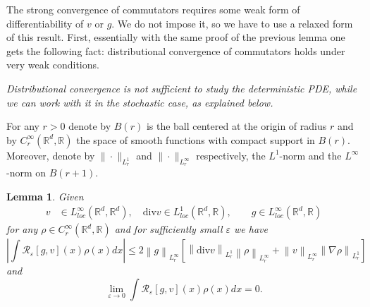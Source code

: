 \documentclass[a4paper,10pt]{article}
\newtheorem{lemma}[theorem]{Lemma}
\begin{document}
The strong convergence of commutators requires some weak form of
differentiability of $v$ or $g$. We do not impose it, so we have to use a
relaxed form of this result. First, essentially with the same proof of the
previous lemma one gets the following fact: distributional convergence of
commutators holds under very weak conditions.

{\it Distributional convergence is not sufficient to study the
 deterministic PDE, while we can work with it in the stochastic
case, as explained below.}


For any $r>0$ denote by $B\left(  r\right)  $ is the
ball centered at the origin of radius $r$ and by $C_{r}^{\infty}(  \mathbb{R}^{d},\mathbb{R})  $ the space
of smooth functions with compact support in $B\left(  r\right)  $.
Moreover, denote by
$\| \cdot \|_{L_{r}^{1}}$ and $\| \cdot\|_{L^{\infty}_r}$ respectively,  the $L^{1}$-norm and the $L^{\infty}$-norm on
$B\left( r+1\right) $.


\begin{lemma}
Given
\begin{align*}
v  &  \in L_{loc}^{\infty}\left(  \mathbb{R}^{d},\mathbb{R}^{d}\right)
,\quad{\mathrm{div}}v\in L_{loc}^{1}\left(  \mathbb{R}^{d},\mathbb{R}\right),
\qquad
g    \in L_{loc}^{\infty}\left(  \mathbb{R}^{d},\mathbb{R}\right)
\end{align*}
for any $\rho \in C_r^\infty(  \mathbb{R}^{d},\mathbb{R})$ and
for sufficiently small $\varepsilon$ we have
\[
\left|  \int\mathcal{R}_{\varepsilon}\left[  g,v\right]  \left(  x\right)
\rho\left(  x\right)  dx\right|  \leq2\left\|  g\right\|  _{L_{r}^{\infty}%
}\left[  \left\|  {\mathrm{div}}v\right\|  _{L_{r}^{1}}\left\|  \rho\right\|
_{L_{r}^{\infty}}+\left\|  v\right\|  _{L_{r}^{\infty}}\left\|  \nabla
\rho\right\|  _{L_{r}^{1}}\right]
\]
and
\[
\lim_{\varepsilon\rightarrow0}\int\mathcal{R}_{\varepsilon}\left[  g,v\right]
\left(  x\right)  \rho\left(  x\right)  dx=0.
\]
\end{lemma}
\end{document}
